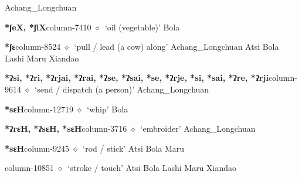          Achang\_Longchuan 
  \item {\footnotesize \textbf{*ʃeX, *ʃiX}}{\tiny column-7410}
         $\diamond$~`oil (vegetable)'
         Bola 
  \item {\footnotesize \textbf{*ʃɛ}}{\tiny column-8524}
         $\diamond$~`pull / lead (a cow) along'
         Achang\_Longchuan 
\hspace{1ex}
         Atsi 
\hspace{1ex}
         Bola 
\hspace{1ex}
         Lashi 
\hspace{1ex}
         Maru 
\hspace{1ex}
         Xiandao 
  \item {\footnotesize \textbf{*ʔsi, *ʔri, *ʔrjai, *ʔrai, *ʔse, *ʔsai, *se, *ʔrje, *si, *sai, *ʔre, *ʔrji}}{\tiny column-9614}
         $\diamond$~`send / dispatch (a person)'
         Achang\_Longchuan 
  \item {\footnotesize \textbf{*sɛH}}{\tiny column-12719}
         $\diamond$~`whip'
         Bola 
  \item {\footnotesize \textbf{*ʔrɛH, *ʔsɛH, *sɛH}}{\tiny column-3716}
         $\diamond$~`embroider'
         Achang\_Longchuan 
  \item {\footnotesize \textbf{*sɛH}}{\tiny column-9245}
         $\diamond$~`rod / stick'
         Atsi 
\hspace{1ex}
         Bola 
\hspace{1ex}
         Maru 
  \item {\footnotesize \textbf{}}{\tiny column-10851}
         $\diamond$~`stroke / touch'
         Atsi 
\hspace{1ex}
         Bola 
\hspace{1ex}
         Lashi 
\hspace{1ex}
         Maru 
\hspace{1ex}
         Xiandao 
